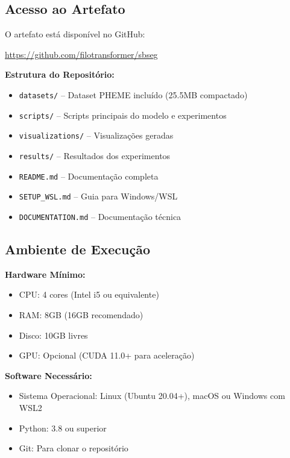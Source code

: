 \documentclass[12pt]{article}
\begin{document}
\subsection{Acesso ao Artefato}

O artefato est\'a dispon\'ivel no GitHub:
\begin{center}
\url{https://github.com/filotransformer/sbseg}
\end{center}

\noindent\textbf{Estrutura do Reposit\'orio:}
\begin{itemize}
    \item \texttt{datasets/} -- Dataset PHEME inclu\'ido (25.5MB compactado)
    \item \texttt{scripts/} -- Scripts principais do modelo e experimentos
    \item \texttt{visualizations/} -- Visualiza\c{c}\~oes geradas
    \item \texttt{results/} -- Resultados dos experimentos
    \item \texttt{README.md} -- Documenta\c{c}\~ao completa
    \item \texttt{SETUP\_WSL.md} -- Guia para Windows/WSL
    \item \texttt{DOCUMENTATION.md} -- Documenta\c{c}\~ao t\'ecnica
\end{itemize}

\subsection{Ambiente de Execu\c{c}\~ao}

\textbf{Hardware M\'inimo:}
\begin{itemize}
    \item CPU: 4 cores (Intel i5 ou equivalente)
    \item RAM: 8GB (16GB recomendado)
    \item Disco: 10GB livres
    \item GPU: Opcional (CUDA 11.0+ para acelera\c{c}\~ao)
\end{itemize}

\textbf{Software Necess\'ario:}
\begin{itemize}
    \item Sistema Operacional: Linux (Ubuntu 20.04+), macOS ou Windows com WSL2
    \item Python: 3.8 ou superior
    \item Git: Para clonar o reposit\'orio
\end{itemize}
\end{document}
